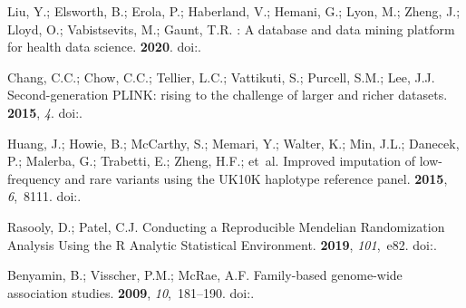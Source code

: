 \documentclass[genes,article,accept,moreauthors,pdftex]{Definitions/mdpi}
\begin{document}
\begin{thebibliography}{999}
Liu, Y.; Elsworth, B.; Erola, P.; Haberland, V.; Hemani, G.; Lyon, M.; Zheng,
  J.; Lloyd, O.; Vabistsevits, M.; Gaunt, T.R.
: A database and data mining platform for health data
  science.
 {\bf 2020}.
\newblock
  doi:{\href{https://doi.org/10.1093/bioinformatics/btaa961}{}}.

Chang, C.C.; Chow, C.C.; Tellier, L.C.; Vattikuti, S.; Purcell, S.M.; Lee, J.J.
\newblock Second-generation {PLINK}: rising to the challenge of larger and
  richer datasets.
 {\bf 2015}, {\em 4}.
\newblock 
  doi:{\href{https://doi.org/10.1186/s13742-015-0047-8}{}}.

Huang, J.; Howie, B.; McCarthy, S.; Memari, Y.; Walter, K.; Min, J.L.; Danecek,
  P.; Malerba, G.; Trabetti, E.; Zheng, H.F.; et~al.
\newblock Improved imputation of low-frequency and rare variants using the
  {UK10K} haplotype reference panel.
 {\bf 2015}, {\em 6},~8111.
\newblock
  doi:{\href{https://doi.org/10.1038/ncomms9111}{}}.

Rasooly, D.; Patel, C.J.
\newblock Conducting a {Reproducible} {Mendelian} {Randomization} {Analysis}
  {Using} the {R} {Analytic} {Statistical} {Environment}.
 {\bf 2019}, {\em 101},~e82.
\newblock
  doi:{\href{https://doi.org/10.1002/cphg.82}{}}.

Benyamin, B.; Visscher, P.M.; McRae, A.F.
\newblock Family-based genome-wide association studies.
 {\bf 2009}, {\em 10},~181--190.
\newblock
  doi:{\href{https://doi.org/10.2217/14622416.10.2.181}{}}.


\end{thebibliography}
\end{document}
